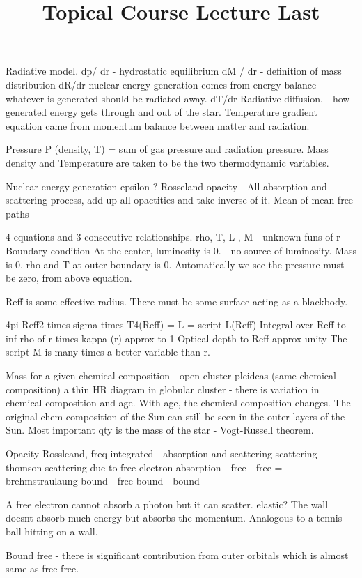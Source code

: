 \documentclass{../template/texnote}
\title{Topical Course Lecture Last}
\begin{document}
    \maketitle {}
Radiative model.
dp/ dr - hydrostatic equilibrium
dM / dr -  definition of mass distribution
dR/dr nuclear energy generation comes from energy balance - whatever is generated should be radiated away.
dT/dr Radiative diffusion. - how generated energy gets through and out of the star.
Temperature gradient equation came from momentum balance between matter and radiation.


Pressure P (density, T) = sum of gas pressure and radiation pressure.
Mass density and Temperature are taken to be the two thermodynamic variables.

Nuclear energy generation epsilon ? 
Rosseland opacity - All absorption and scattering process, add up all opactities and take inverse of it.
Mean of mean free paths 

4 equations and 3 consecutive relationships.
rho, T, L , M - unknown funs of r
Boundary condition 
At the center, luminosity is 0. - no source of luminosity.
Mass is 0.
rho and T at outer boundary is 0.
Automatically we see the pressure must be zero, from above equation.

Reff is some effective radius.
There must be some surface acting as a blackbody.

4pi Reff2 times sigma times T4(Reff) = L = script L(Reff)
Integral over Reff to inf rho of r times kappa (r) approx to 1
Optical depth to Reff approx unity
The script M is many times a better variable than r.

Mass for a given chemical composition - open cluster pleideas (same chemical composition) a thin HR diagram
in globular cluster - there is variation in chemical composition and age.
With age, the chemical composition changes.
The original chem composition of the Sun can still be seen in the outer layers of the Sun.
Most important qty is the mass of the star - Vogt-Russell theorem.


Opacity
Rossleand, freq integrated - absorption and scattering
scattering - thomson scattering due to free electron
absorption -
free - free = brehmstraulaung
bound - free 
bound - bound

A free electron cannot absorb a photon but it can scatter. elastic? 
The wall doesnt absorb much energy but absorbs the momentum.
Analogous to a tennis ball hitting on a wall.


Bound free - there is significant contribution from outer orbitals which is almost same as free free.
\end{document}
